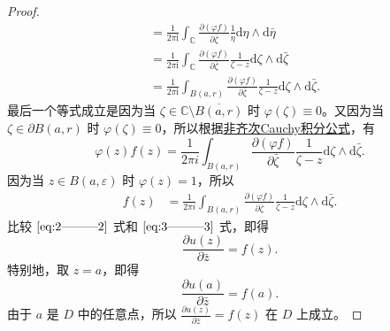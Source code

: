 \documentclass[../../main.tex]{subfiles}%
\begin{document}
\begin{proof}
\begin{align}
&=\frac{1}{2\pi \mathrm{i}}\int_{\mathbb{C}}{\frac{\partial (\varphi f)}{\partial \bar{\zeta}}\frac{1}{\eta}\mathrm{d}\eta}\land \mathrm{d}\bar{\eta}
\nonumber 
\\
&=\frac{1}{2\pi \mathrm{i}}\int_{\mathbb{C}}{\frac{\partial (\varphi f)}{\partial \bar{\zeta}}\frac{1}{\zeta -z}\mathrm{d}\zeta}\land \mathrm{d}\bar{\zeta}
\nonumber 
\\
&=\frac{1}{2\pi \mathrm{i}}\int_{B(a,r)}{\frac{\partial (\varphi f)}{\partial \bar{\zeta}}\frac{1}{\zeta -z}\mathrm{d}\zeta}\land \mathrm{d}\bar{\zeta}.\label{eq:2---------2}
\end{align}
最后一个等式成立是因为当 \( \zeta \in \mathbb{C} \setminus \overline{B(a,r)} \) 时 \( \varphi(\zeta) \equiv 0 \)。又因为当 \( \zeta \in \partial B(a,r) \) 时 \( \varphi(\zeta) \equiv 0 \)，所以根据\hyperref[theorem:非齐次Cauchy积分公式(Pompeiu公式)]{非齐次Cauchy积分公式}，有
\[
\varphi(z)f(z) = \frac{1}{2\pi i} \int_{B(a,r)} \frac{\partial(\varphi f)}{\partial \bar{\zeta}} \frac{1}{\zeta - z} \mathrm{d}\zeta \wedge \mathrm{d}\bar{\zeta}.
\]
因为当 \( z \in B(a,\varepsilon) \) 时 \( \varphi(z) = 1 \)，所以
\begin{align}
f(z) &= \frac{1}{2\pi i} \int_{B(a,r)} \frac{\partial(\varphi f)}{\partial \bar{\zeta}} \frac{1}{\zeta - z} \mathrm{d}\zeta \wedge \mathrm{d}\bar{\zeta}. \label{eq:3---------3}
\end{align}
比较 \(\eqref{eq:2---------2}\) 式和 \(\eqref{eq:3---------3}\) 式，即得
\[
\frac{\partial u(z)}{\partial \bar{z}} = f(z).
\]
特别地，取 \( z = a \)，即得
\[
\frac{\partial u(a)}{\partial \bar{z}} = f(a).
\]
由于 \( a \) 是 \( D \) 中的任意点，所以 \( \frac{\partial u(z)}{\partial \bar{z}} = f(z) \) 在 \( D \) 上成立。

\end{proof}
\end{document}
